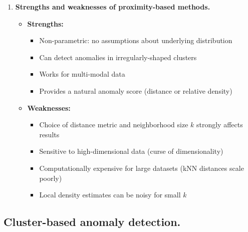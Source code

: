 \documentclass{article}
\begin{document}
\begin{enumerate}
\item \textbf{Strengths and weaknesses of proximity-based methods.}

\begin{itemize}
    \item \textbf{Strengths:}
    \begin{itemize}
        \item Non-parametric: no assumptions about underlying distribution
        \item Can detect anomalies in irregularly-shaped clusters
        \item Works for multi-modal data
        \item Provides a natural anomaly score (distance or relative density)
    \end{itemize}

    \item \textbf{Weaknesses:}
    \begin{itemize}
        \item Choice of distance metric and neighborhood size \(k\) strongly affects results
        \item Sensitive to high-dimensional data (curse of dimensionality)
        \item Computationally expensive for large datasets (kNN distances scale poorly)
        \item Local density estimates can be noisy for small \(k\)
    \end{itemize}
\end{itemize}
\end{enumerate}

\subsection*{Cluster-based anomaly detection.}
\end{document}
